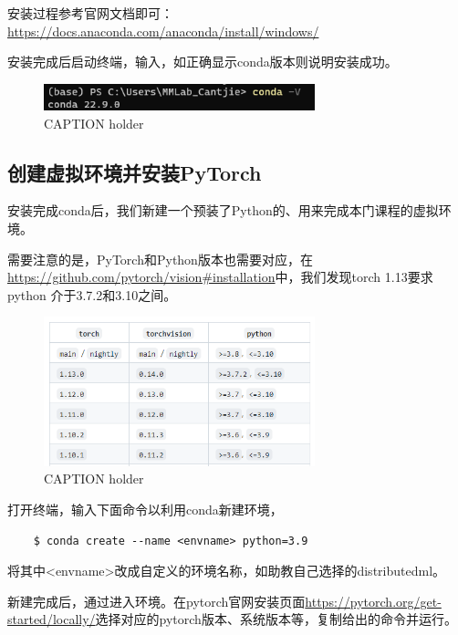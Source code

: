 安装过程参考官网文档即可：
\url{https://docs.anaconda.com/anaconda/install/windows/}

安装完成后启动终端，输入，如正确显示conda版本则说明安装成功。
\begin{figure}[htbp]
	\centering
	\includegraphics[width=0.7\textwidth]{figures/conda-install-success.png}
	\caption{CAPTION holder}
	\label{LABEL holder}
\end{figure}

\subsection{创建虚拟环境并安装PyTorch} \label{subsec:local-env-create}

安装完成conda后，我们新建一个预装了Python的、用来完成本门课程的虚拟环境。

需要注意的是，PyTorch和Python版本也需要对应，在\url{https://github.com/pytorch/vision#installation}中，我们发现torch 1.13要求python 介于3.7.2和3.10之间。

\begin{figure}[htbp]
	\centering
	\includegraphics[width=0.7\textwidth]{figures/pytorch-python-version-compability.png}
	\caption{CAPTION holder}
	\label{LABEL holder}
\end{figure}

打开终端，输入下面命令以利用conda新建环境，
\begin{lstlisting}
    $ conda create --name <envname> python=3.9
\end{lstlisting}
将其中<envname>改成自定义的环境名称，如助教自己选择的distributedml。

新建完成后，通过进入环境。在pytorch官网安装页面\url{https://pytorch.org/get-started/locally/}选择对应的pytorch版本、系统版本等，复制给出的命令并运行。

